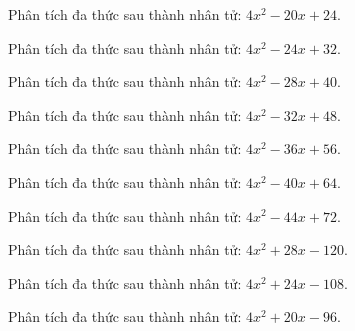 \begin{bt}
	Phân tích đa thức sau thành nhân tử: $4 x^2 - 20 x + 24$.
\end{bt}
\begin{bt}
	Phân tích đa thức sau thành nhân tử: $4 x^2 - 24 x + 32$.
\end{bt}
\begin{bt}
	Phân tích đa thức sau thành nhân tử: $4 x^2 - 28 x + 40$.
\end{bt}
\begin{bt}
	Phân tích đa thức sau thành nhân tử: $4 x^2 - 32 x + 48$.
\end{bt}
\begin{bt}
	Phân tích đa thức sau thành nhân tử: $4 x^2 - 36 x + 56$.
\end{bt}
\begin{bt}
	Phân tích đa thức sau thành nhân tử: $4 x^2 - 40 x + 64$.
\end{bt}
\begin{bt}
	Phân tích đa thức sau thành nhân tử: $4 x^2 - 44 x + 72$.
\end{bt}
\begin{bt}
	Phân tích đa thức sau thành nhân tử: $4 x^2 + 28 x - 120$.
\end{bt}
\begin{bt}
	Phân tích đa thức sau thành nhân tử: $4 x^2 + 24 x - 108$.
\end{bt}
\begin{bt}
	Phân tích đa thức sau thành nhân tử: $4 x^2 + 20 x - 96$.
\end{bt}
